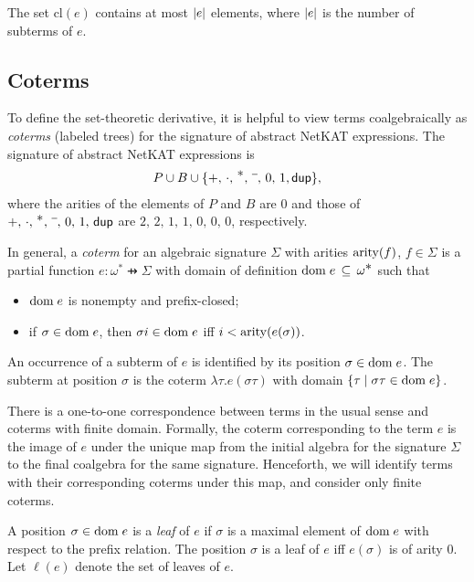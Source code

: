 \documentclass{article}
\newcommand\pdup{\mathop{\mathsf{dup}}}
\renewcommand\star{^{\textstyle *}}
\newcommand\clname{\mathrm{cl}}
\newcommand\cl[1]{\clname(#1)}
\begin{document}
\begin{lemma}
\label{eq:derivlinear}
The set $\cl e$ contains at most $|e|$ elements, where $|e|$ is the
number of subterms of $e$.
\end{lemma}
%
\subsection*{Coterms}

To define the set-theoretic derivative, it is helpful to view terms coalgebraically as \emph{coterms} (labeled trees) for the signature of abstract NetKAT expressions. The signature of abstract NetKAT expressions is
\begin{align*}
P\cup B\cup\{+,\,\cdot,\,\star,\,\barnone,\,0,\,1,\pdup\},
\end{align*}
where the arities of the elements of $P$ and $B$ are $0$ and those of $+,\,\cdot,\,\star,\,\barnone,\,0,\,1,\,\pdup$ are $2,\,2,\,1,\,1,\,0,\,0,\,0$, respectively.

In general, a \emph{coterm} for an algebraic signature $\Sigma$ with arities $\mathrm{arity}(f)$, $f\in\Sigma$ is a partial function $e:\omega\star\pfun\Sigma$ with domain of definition $\dom e\subs\omega\star$ such that
\begin{itemize}
\item 
${\rm dom\;}e$ is nonempty and prefix-closed;
\item
if $\sigma\in{\rm dom\;}e$, then $\sigma i\in{\rm dom\;}e$ iff $i < \mathrm{arity}(e(\sigma))$.
\end{itemize}
An occurrence of a subterm of $e$ is identified by its position $\sigma\in{\rm dom\;}e$.  The subterm at position $\sigma$ is the coterm $\lambda\tau.e(\sigma\tau)$ with domain $\{\tau \mid \sigma\tau\in{\rm dom\;}e\}$.

There is a one-to-one correspondence between terms in the usual sense and coterms with finite domain. Formally, the coterm corresponding to the term $e$ is the image of $e$ under the unique map from the initial algebra for the signature $\Sigma$ to the final coalgebra for the same signature. Henceforth, we will identify terms with their corresponding coterms under this map, and consider only finite coterms.

A position $\sigma\in{\rm dom\;}e$ is a \emph{leaf} of $e$ if $\sigma$ is a maximal element of ${\rm dom\;}e$ with respect to the prefix relation. The position $\sigma$ is a leaf of $e$ iff $e(\sigma)$ is of arity 0. Let $\ell(e)$ denote the set of leaves of $e$.
\end{document}
